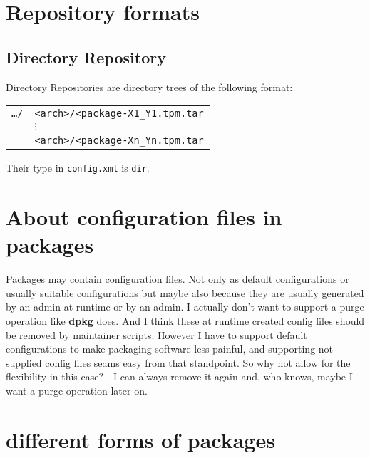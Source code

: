 \documentclass[a4paper]{scrartcl}
\newcommand{\file}[1]{\texttt{#1}}
\newcommand{\program}[1]{\textbf{#1}}
\begin{document}
	\noindent

	
	\section{Repository formats}
	\label{sec:repository_formats}
	
	
	\subsection{Directory Repository}
	\label{ssec:directory_repository}
	
	Directory Repositories are directory trees of the following format:
	
	\vspace{1em}	
	\noindent
	\begin{tabular}{rl}
		\file{\dots/} & \file{<arch>/<package-X1\_Y1.tpm.tar} \\
		& \hspace{0.5cm} $\vdots$ \\
		& \file{<arch>/<package-Xn\_Yn.tpm.tar} \\
	\end{tabular}

	\vspace{1em}
	Their type in \file{config.xml} is \texttt{dir}.
	
	
	\section{About configuration files in packages}
	\label{sec:about_configuration_files_in_pacakges}
	
	Packages may contain configuration files. Not only as default configurations or usually suitable configurations but maybe also because they are usually generated by an admin at runtime or by an admin. I actually don't want to support a purge operation like \program{dpkg} does. And I think these at runtime created config files should be removed by maintainer scripts. However I have to support default configurations to make packaging software less painful, and supporting not-supplied config files seams easy from that standpoint. So why not allow for the flexibility in this case? - I can always remove it again and, who knows, maybe I want a purge operation later on.
	
	
	\section{different forms of packages}
	\label{sec:differnt_forms_of_packages}
	
\end{document}
